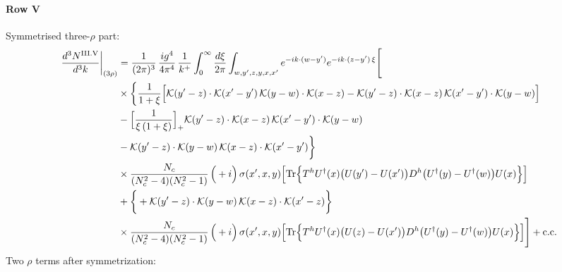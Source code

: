 \documentclass[9pt]{article}
\numberwithin{equation}{section}
\begin{document}
\paragraph*{Row V}
Symmetrised three-$\rho$ part:
\begin{align}
\frac{d^{3}N^{\rm III.V}}{d^{3}k}\bigg|_{(3\rho)} &=\frac{1}{(2\pi)^{3}}\,\frac{ig^{4}}{4\pi^{4}}\,\frac{1}{k^{+}}\int_{0}^{\infty}\frac{d\xi}{2\pi}\int_{w,y',z,y,x,x'}e^{-ik\cdot(w-y')}e^{-ik\cdot(z-y')\,\xi}\Bigg[\notag\\
&\times\bigg\{\frac{1}{1+\xi}\Big[\mathcal{K}(y'-z)\cdot\mathcal{K}(x'-y')\,\mathcal{K}(y-w)\cdot\mathcal{K}(x-z)-\mathcal{K}(y'-z)\cdot\mathcal{K}(x-z)\,\mathcal{K}(x'-y')\cdot\mathcal{K}(y-w)\Big]\notag\\
&-\Big[\frac{1}{\xi\,(1+\xi)}\Big]_{+}\mathcal{K}(y'-z)\cdot\mathcal{K}(x-z)\,\mathcal{K}(x'-y')\cdot\mathcal{K}(y-w)\notag\\
&-\mathcal{K}(y'-z)\cdot\mathcal{K}(y-w)\,\mathcal{K}(x-z)\cdot\mathcal{K}(x'-y')\bigg\}\notag\\
&\times \frac{N_{c}}{(N_{c}^{2}-4)(N_{c}^{2}-1)}\,\Big(+i\Big)\,\sigma(x',x,y)\Big[{\rm Tr}\Big\{T^{h}U^{\dagger}(x)\big(U(y')-U(x')\big)D^{h}\big(U^{\dagger}(y)-U^{\dagger}(w)\big)U(x)\Big\}\Big]\notag\\
&+\bigg\{+\mathcal{K}(y'-z)\cdot\mathcal{K}(y-w)\,\mathcal{K}(x-z)\cdot\mathcal{K}(x'-z)\bigg\}\notag\\
&\times \frac{N_{c}}{(N_{c}^{2}-4)(N_{c}^{2}-1)}\,\Big(+i\Big)\,\sigma(x',x,y)\Big[{\rm Tr}\Big\{T^{h}U^{\dagger}(x)\big(U(z)-U(x')\big)D^{h}\big(U^{\dagger}(y)-U^{\dagger}(w)\big)U(x)\Big\}\Big]\Bigg]+{\rm c.c.}\label{eq:S-III.V-3}
\end{align}
Two $\rho$ terms after symmetrization: 
\end{document}
